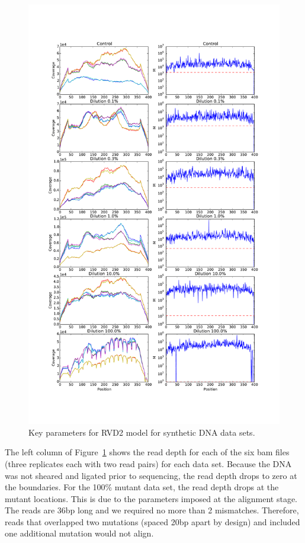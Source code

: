 \documentclass[11pt,reqno]{amsart}
\begin{document}
\begin{figure}[htbp]
\begin{center}
\includegraphics[width=120mm]{pdf_figs/depthM.pdf}
\caption{Key parameters for RVD2 model for synthetic DNA data sets.}
\label{fig:depthM}
\end{center}
\end{figure}

The left column of Figure~\ref{fig:depthM} shows the read depth for each of the six bam files (three replicates each with two read pairs) for each data set. Because the DNA was not sheared and ligated prior to sequencing, the read depth drops to zero at the boundaries. For the 100\% mutant data set, the read depth drops at the mutant locations. This is due to the parameters imposed at the alignment stage. The reads are 36bp long and we required no more than 2 mismatches. Therefore, reads that overlapped two mutations (spaced 20bp apart by design) and included one additional mutation would not align.
\end{document}
